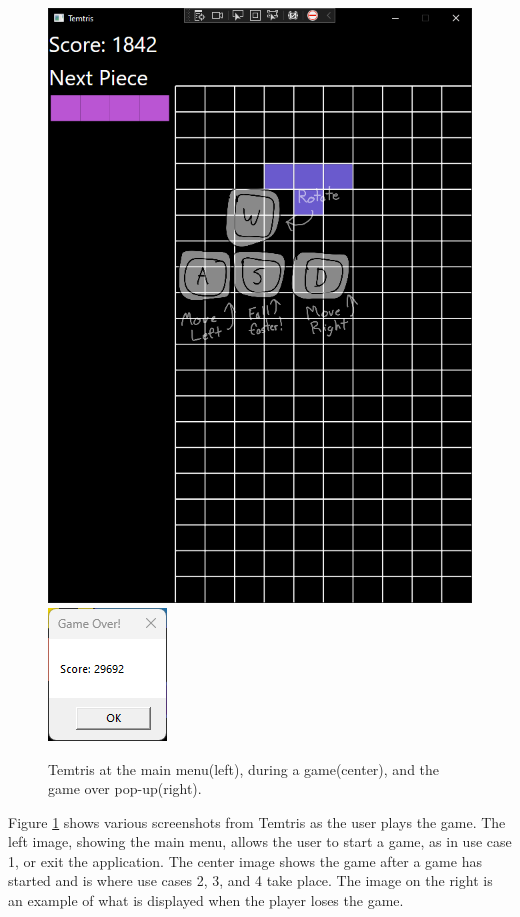\documentclass[10pt,conference,onecolumn,compsoc]{IEEEtran}
\begin{document}
\begin{figure}[!h]
\includegraphics[scale=0.3]{Temtris_Game.png}
\includegraphics[scale=.8]{Temtris_GameOver.png}
\caption{Temtris at the main menu(left), during a game(center), and the game over pop-up(right).}
\label{fig:uimockups}
\end{figure}

Figure \ref{fig:uimockups} shows various screenshots from Temtris as the user plays the game. The left image, showing the main menu, allows the user to start a game, as in use case 1, or exit the application. The center image shows the game after a game has started and is where use cases 2, 3, and 4 take place. The image on the right is an example of what is displayed when the player loses the game.
\end{document}
